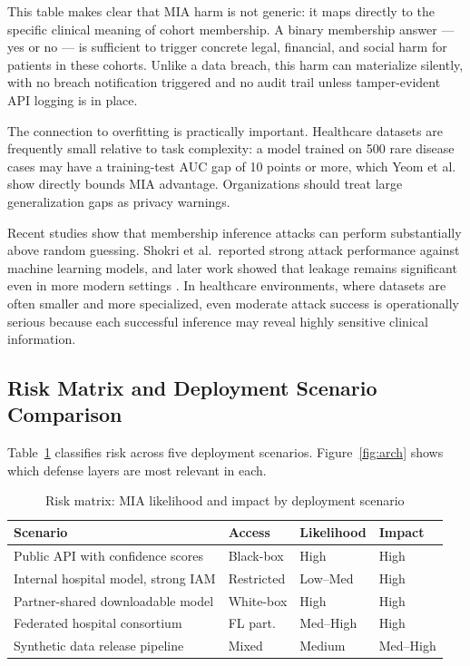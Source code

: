 \documentclass[conference]{IEEEtran}
\begin{document}
	This table makes clear that MIA harm is not generic: it maps directly to the specific clinical meaning of cohort membership. A binary membership answer --- yes or no --- is sufficient to trigger concrete legal, financial, and social harm for patients in these cohorts. Unlike a data breach, this harm can materialize silently, with no breach notification triggered and no audit trail unless tamper-evident API logging is in place.

	The connection to overfitting is practically important. Healthcare datasets are frequently small relative to task complexity: a model trained on 500 rare disease cases may have a training-test AUC gap of 10 points or more, which Yeom et al.\ \cite{yeom2018} show directly bounds MIA advantage. Organizations should treat large generalization gaps as privacy warnings.

Recent studies show that membership inference attacks can perform substantially above random guessing. Shokri et al.\ reported strong attack performance against machine learning models, and later work showed that leakage remains significant even in more modern settings \cite{shokri2017,carlini2022}. In healthcare environments, where datasets are often smaller and more specialized, even moderate attack success is operationally serious because each successful inference may reveal highly sensitive clinical information.

	\subsection{Risk Matrix and Deployment Scenario Comparison}
	Table~\ref{tab:risk} classifies risk across five deployment scenarios. Figure~\ref{fig:arch} shows which defense layers are most relevant in each.

	\begin{table}[H]
		\centering
		\caption{Risk matrix: MIA likelihood and impact by deployment scenario}
		\label{tab:risk}
		\scriptsize
		\begin{tabularx}{\linewidth}{>{\raggedright\arraybackslash}X >{\raggedright\arraybackslash}p{1.1cm} >{\raggedright\arraybackslash}p{1.1cm} >{\raggedright\arraybackslash}p{1.0cm}}
			\toprule
			Scenario & Access & Likelihood & Impact \\
			\midrule
			Public API with confidence scores & Black-box & High & High \\
			Internal hospital model, strong IAM & Restricted & Low--Med & High \\
			Partner-shared downloadable model & White-box & High & High \\
			Federated hospital consortium & FL part. & Med--High & High \\
			Synthetic data release pipeline & Mixed & Medium & Med--High \\
			\bottomrule
		\end{tabularx}
	\end{table}
\end{document}
